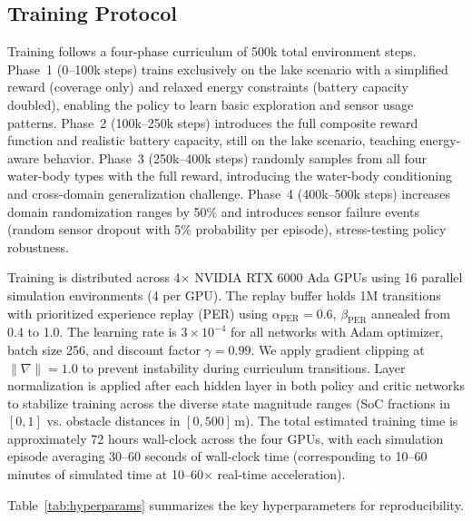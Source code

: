 \documentclass[conference]{IEEEtran}
\begin{document}
\subsection{Training Protocol}

Training follows a four-phase curriculum of 500k total environment steps.
Phase~1 (0--100k steps) trains exclusively on the lake scenario with a simplified reward (coverage only) and relaxed energy constraints (battery capacity doubled), enabling the policy to learn basic exploration and sensor usage patterns. Phase~2 (100k--250k steps) introduces the full composite reward function and realistic battery capacity, still on the lake scenario, teaching energy-aware behavior. Phase~3 (250k--400k steps) randomly samples from all four water-body types with the full reward, introducing the water-body conditioning and cross-domain generalization challenge. Phase~4 (400k--500k steps) increases domain randomization ranges by 50\% and introduces sensor failure events (random sensor dropout with 5\% probability per episode), stress-testing policy robustness.

Training is distributed across 4$\times$ NVIDIA RTX 6000 Ada GPUs using 16 parallel simulation environments (4 per GPU). The replay buffer holds 1M transitions with prioritized experience replay (PER) using $\alpha_{\text{PER}} = 0.6$, $\beta_{\text{PER}}$ annealed from 0.4 to 1.0. The learning rate is $3 \times 10^{-4}$ for all networks with Adam optimizer, batch size 256, and discount factor $\gamma = 0.99$. We apply gradient clipping at $\|\nabla\| = 1.0$ to prevent instability during curriculum transitions. Layer normalization is applied after each hidden layer in both policy and critic networks to stabilize training across the diverse state magnitude ranges (SoC fractions in $[0,1]$ vs. obstacle distances in $[0, 500]$\,m). The total estimated training time is approximately 72 hours wall-clock across the four GPUs, with each simulation episode averaging 30--60 seconds of wall-clock time (corresponding to 10--60 minutes of simulated time at 10--60$\times$ real-time acceleration).

Table~\ref{tab:hyperparams} summarizes the key hyperparameters for reproducibility.
\end{document}
